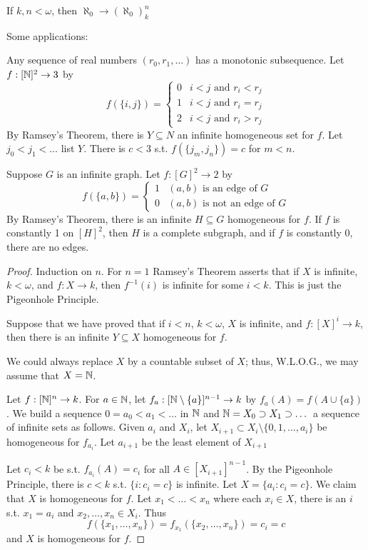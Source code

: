 \documentclass[11pt]{article}
\begin{document}
\begin{theorem}
If \(k,n<\omega\), then \(\aleph_0\to(\aleph_0)^n_k\)
\end{theorem}

Some applications:

Any sequence of real numbers \((r_0,r_1,\dots)\) has a monotonic subsequence. Let \(f:[\mathbb{N}]^2\to 3\) by
\begin{equation*}
f(\{i,j\})=
\begin{cases}
0&i<j\text{ and }r_i<r_j\\
1&i<j\text{ and }r_i=r_j\\
2&i<j\text{ and }r_i>r_j
\end{cases}
\end{equation*}
By Ramsey's Theorem, there is \(Y\subseteq N\) an infinite homogeneous set for \(f\). Let \(j_0<j_1<\dots\)
list \(Y\). There is \(c<3\) s.t. \(f(\{j_m,j_n\})=c\) for \(m<n\).

Suppose \(G\) is an infinite graph. Let \(f:[G]^2\to 2\) by
\begin{equation*}
f(\{a,b\})=
\begin{cases}
1&(a,b)\text{ is an edge of }G\\
0&(a,b)\text{ is not an edge of }G
\end{cases}
\end{equation*}
By Ramsey's Theorem, there is an infinite \(H\subseteq G\) homogeneous for \(f\). If \(f\) is constantly
1 on \([H]^2\), then \(H\) is a complete subgraph, and if \(f\) is constantly 0, there are no
edges.

\begin{proof}
Induction on \(n\). For \(n=1\) Ramsey's Theorem asserts that if \(X\) is infinite, \(k<\omega\),
and \(f:X\to k\), then \(f^{-1}(i)\) is infinite for some \(i<k\). This is just the Pigeonhole
Principle.

Suppose that we have proved that if \(i<n\), \(k<\omega\), \(X\) is infinite, and \(f:[X]^i\to k\), then
there is an infinite \(Y\subseteq X\) homogeneous for \(f\).

We could always replace \(X\) by a countable subset of \(X\); thus, W.L.O.G., we may assume
that \(X=\mathbb{N}\).

Let \(f:[\mathbb{N}]^n\to k\). For \(a\in\mathbb{N}\), let \(f_a:[\mathbb{N}\setminus\{a\}]^{n-1}\to k\) by \(f_a(A)=f(A\cup\{a\})\). We build a
sequence \(0=a_0<a_1<\dots\) in \(\mathbb{N}\) and \(\mathbb{N}=X_0\supset X_1\supset\dots\) a sequence of infinite sets as follows.
Given \(a_i\) and \(X_i\), let \(X_{i+1}\subset X_i\setminus\{0,1,\dots,a_i\}\) be homogeneous for \(f_{a_i}\).
Let \(a_{i+1}\) be the least element of \(X_{i+1}\)

Let \(c_i<k\) be s.t. \(f_{a_i}(A)=c_i\) for all \(A\in[X_{i+1}]^{n-1}\). By the Pigeonhole
Principle, there is \(c<k\) s.t. \(\{i:c_i=c\}\) is infinite. Let \(X=\{a_i:c_i=c\}\). We claim
that \(X\) is homogeneous for \(f\). Let \(x_1<\dots<x_n\) where each \(x_i\in X\), there is an \(i\)
s.t. \(x_1=a_i\) and \(x_2,\dots,x_n\in X_i\). Thus
\begin{equation*}
f(\{x_1,\dots,x_n\})=f_{x_1}(\{x_2,\dots,x_n\})=c_i=c
\end{equation*}
and \(X\) is homogeneous for \(f\).
\end{proof}
\end{document}
